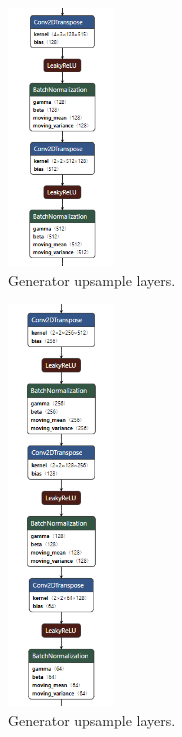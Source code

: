\documentclass[12pt,a4paper,oneside]{memoir}
\begin{document}
    
      
    \begin{figure}[H]
    \centering
    \includegraphics[width=0.25\textwidth]{images/generator_2.png}
    \caption{Generator upsample layers.}
    \centering
    \label{fig:neuron}
    \end{figure}
    
    
      
    \begin{figure}[H]
    \centering
    \includegraphics[width=0.25\textwidth]{images/generator_3.png}
    \caption{Generator upsample layers.}
    \centering
    \label{fig:neuron}
    \end{figure}
    
\end{document}
